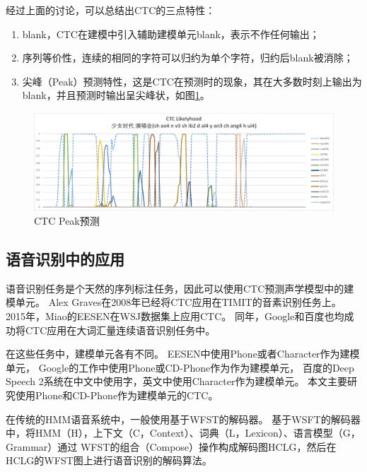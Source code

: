 经过上面的讨论，可以总结出CTC的三点特性：
\begin{enumerate}
\item blank，CTC在建模中引入辅助建模单元blank，表示不作任何输出；
\item 序列等价性，连续的相同的字符可以归约为单个字符，归约后blank被消除；
\item 尖峰（Peak）预测特性，这是CTC在预测时的现象，其在大多数时刻上输出为blank，并且预测时输出呈尖峰状，如图\ref{fig:peak}。
\end{enumerate}

\begin{figure}
\centering
\includegraphics[width=1.0\textwidth]{figures/chapter4/peak-crop}
\caption{CTC Peak预测}
\label{fig:peak}
\end{figure}

\subsection{语音识别中的应用}

语音识别任务是个天然的序列标注任务，因此可以使用CTC预测声学模型中的建模单元。
Alex Graves在2008年已经将CTC应用在TIMIT的音素识别任务上。
2015年，Miao的EESEN在WSJ数据集上应用CTC。
同年，Google和百度也均成功将CTC应用在大词汇量连续语音识别任务中。

在这些任务中，建模单元各有不同。
EESEN中使用Phone或者Character作为建模单元，
Google的工作中使用Phone或CD-Phone作为作为建模单元，
百度的Deep Speech 2系统在中文中使用字，英文中使用Character作为建模单元。
本文主要研究使用Phone和CD-Phone作为建模单元的CTC。

在传统的HMM语音系统中，一般使用基于WFST的解码器。
基于WSFT的解码器中，将HMM（H），上下文（C，Context）、词典（L，Lexicon）、语言模型（G，Grammar）通过
WFST的组合（Compose）操作构成解码图HCLG，然后在HCLG的WFST图上进行语音识别的解码算法。


